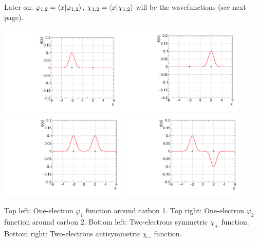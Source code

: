 \documentclass[12pt]{article}
\begin{document}
Later on: $\varphi_{1,2} = \bra{x}\ket{\varphi_{1,2}}$, 
$\chi_{1,2} = \bra{x}\ket{\chi_{1,2}}$ will be the wavefunctions (see next page).
\clearpage


\begin{center}
\includegraphics[width=0.44\textwidth]{Figures/phi1.pdf}
\includegraphics[width=0.45\textwidth]{Figures/phi2.pdf}\\
\includegraphics[width=0.45\textwidth]{Figures/chiPlus.pdf}
\includegraphics[width=0.45\textwidth]{Figures/chiMinus.pdf}
\end{center}
Top left: One-electron $\varphi_{1}$ function around carbon 1.
Top right: One-electron $\varphi_{2}$ function around carbon 2.
Bottom left: Two-electrons symmetric $\chi_{+}$ function.
Bottom right: Two-electrons antisymmetric $\chi_{-}$ function.
\end{document}
